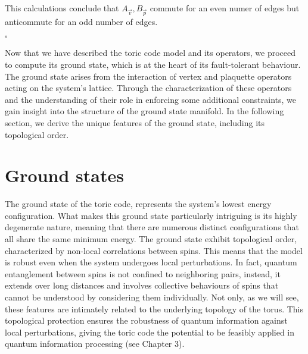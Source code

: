 \documentclass{Configuration_Files/PoliMi3i_thesis}
\begin{document}
This calculations conclude that $A_{\vec{v}},B_{\vec{p}}$ commute for an even numer of edges but anticommute for an odd number of edges.\newline

\hfill $\square$\newline

Now that we have described the toric code model and its operators, we proceed to compute its ground state, which is at the heart of its fault-tolerant behaviour. The ground state arises from the interaction of vertex and plaquette operators acting on the system's lattice. Through the characterization of these operators and the understanding of their role in enforcing some additional constraints, we gain insight into the structure of the ground state manifold. \newline
In the following section, we derive the unique features of the ground state, including its topological order. \newline 




















\newpage
\section{Ground states}
\label{sec:GS}

The ground state of the toric code, represents the system's lowest energy configuration. What makes this ground state particularly intriguing is its highly degenerate nature, meaning that there are numerous distinct configurations that all share the same minimum energy. 
The ground state exhibit topological order, characterized by non-local correlations between spins. This means that the model is robust  even when the system undergoes local perturbations.  In fact, quantum entanglement between spins is not confined to neighboring pairs, instead, it extends over long distances and involves collective behaviours of spins that cannot be understood by considering them individually.
Not only, as we will see, these features are intimately related to the underlying topology of the torus. This topological protection ensures the robustness of quantum information against local perturbations, giving the toric code the potential to be feasibly applied in quantum information processing (see Chapter 3).\newline
\end{document}
